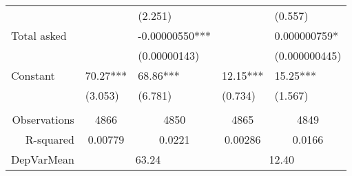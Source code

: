 \begin{tabular}{rrrrr}
\multicolumn{1}{l}{} & \multicolumn{1}{l}{} & \multicolumn{1}{l}{(2.251)} & \multicolumn{1}{l}{} & \multicolumn{1}{l}{(0.557)} \\
\multicolumn{1}{l}{Total asked} & \multicolumn{1}{l}{} & \multicolumn{1}{l}{-0.00000550***} & \multicolumn{1}{l}{} & \multicolumn{1}{l}{0.000000759*} \\
\multicolumn{1}{l}{} & \multicolumn{1}{l}{} & \multicolumn{1}{l}{(0.00000143)} & \multicolumn{1}{l}{} & \multicolumn{1}{l}{(0.000000445)} \\
\multicolumn{1}{l}{Constant } & \multicolumn{1}{l}{70.27***} & \multicolumn{1}{l}{68.86***} & \multicolumn{1}{l}{12.15***} & \multicolumn{1}{l}{15.25***} \\
\multicolumn{1}{l}{} & \multicolumn{1}{l}{(3.053)} & \multicolumn{1}{l}{(6.781)} & \multicolumn{1}{l}{(0.734)} & \multicolumn{1}{l}{(1.567)} \\
      &       &       &       &  \\
      \midrule
Observations & \multicolumn{1}{c}{4866} & \multicolumn{1}{c}{4850} & \multicolumn{1}{c}{4865} & \multicolumn{1}{c}{4849} \\
R-squared & \multicolumn{1}{c}{0.00779} & \multicolumn{1}{c}{0.0221} & \multicolumn{1}{c}{0.00286} & \multicolumn{1}{c}{0.0166} \\
DepVarMean & \multicolumn{2}{c}{63.24} & \multicolumn{2}{c}{12.40} \\
\bottomrule
\bottomrule
\end{tabular}%
